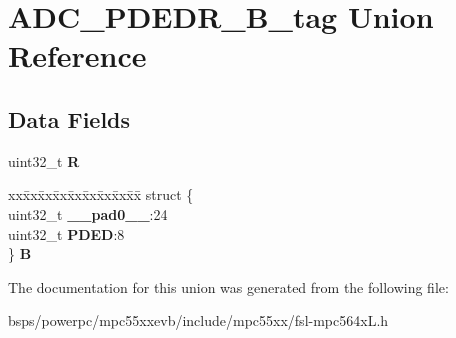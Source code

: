 \hypertarget{unionADC__PDEDR__32B__tag}{}\section{A\+D\+C\+\_\+\+P\+D\+E\+D\+R\+\_\+B\+\_\+tag Union Reference}
\label{unionADC__PDEDR__32B__tag}
\subsection*{Data Fields}
\begin{DoxyCompactItemize}
\item 
\mbox{\label{unionADC__PDEDR__32B__tag_abade5223b1521f28989e147e3b17bc7b}} 
uint32\+\_\+t {\bfseries R}
\item 
\mbox{\label{unionADC__PDEDR__32B__tag_a5343b1a90c11e94366076737814da21e}} 
\begin{tabbing}
xx\=xx\=xx\=xx\=xx\=xx\=xx\=xx\=xx\=\kill
struct \{\\
\>uint32\_t {\bfseries \_\_pad0\_\_}:24\\
\>uint32\_t {\bfseries PDED}:8\\
\} {\bfseries B}\\

\end{tabbing}\end{DoxyCompactItemize}


The documentation for this union was generated from the following file\+:\begin{DoxyCompactItemize}
\item 
bsps/powerpc/mpc55xxevb/include/mpc55xx/fsl-\/mpc564x\+L.\+h\end{DoxyCompactItemize}
